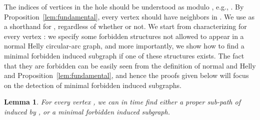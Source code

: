 \documentclass[10pt]{article}
\newtheorem{lemma}[theorem]{Lemma}
\newcommand{\badgraph}{minimal forbidden induced subgraph}
\newcommand{\nhcag}{normal Helly circular-arc graph}
\begin{document}
The indices of vertices in the hole  should be understood as modulo , e.g., .  By Proposition~\ref{lem:fundamental}, every vertex
should have neighbors in .  We use  as a shorthand for
, regardless of whether  or not.  We start from
characterizing  for every vertex : we specify some
forbidden structures not allowed to appear in a \nhcag, and more
importantly, we show how to find a minimal forbidden induced subgraph
if one of these structures exists.  The fact that they are forbidden
can be easily seen from the definition of normal and Helly and
Proposition~\ref{lem:fundamental}, and hence the proofs given below
will focus on the detection of \badgraph s.
\begin{lemma}\label{lem:non-consecutive}
  For every vertex , we can in  time find either a proper
  sub-path of  induced by , or a \badgraph.
\end{lemma}
\end{document}

